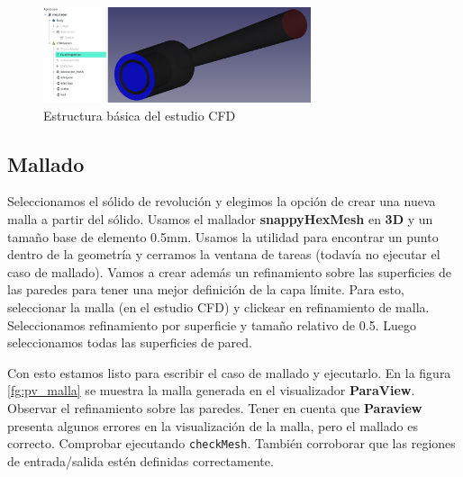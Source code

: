 \documentclass[oneside,a4paper,spanish,links]{amca}
\begin{document}
\begin{figure}[htb]
	\centerline{\includegraphics[width=0.7\textwidth]{Figuras/02_ESTRUCTURA_FREECAD.png}} \caption{Estructura básica del estudio CFD} \label{fg:estructura_freecad}
\end{figure}

\subsection{Mallado}
Seleccionamos el sólido de revolución y elegimos la opción de crear una nueva malla a partir del sólido. Usamos el mallador \textbf{snappyHexMesh} en \textbf{3D} y un tamaño base de elemento 0.5mm. Usamos la utilidad para encontrar un punto dentro de la geometría y cerramos la ventana de tareas (todavía no ejecutar el caso de mallado). Vamos a crear además un refinamiento sobre las superficies de las paredes para tener una mejor definición de la capa límite. Para esto, seleccionar la malla (en el estudio CFD) y clickear en refinamiento de malla. Seleccionamos refinamiento por superficie y tamaño relativo de 0.5. Luego seleccionamos todas las superficies de pared.

Con esto estamos listo para escribir el caso de mallado y ejecutarlo. En la figura \ref{fg:pv_malla} se muestra la malla generada en el visualizador \textbf{ParaView}. Observar el refinamiento sobre las paredes. Tener en cuenta que \textbf{Paraview} presenta algunos errores en la visualización de la malla, pero el mallado es correcto. Comprobar ejecutando \texttt{checkMesh}. También corroborar que las regiones de entrada/salida estén definidas correctamente.
\end{document}
